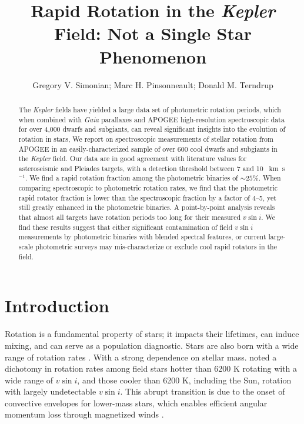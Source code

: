 \documentclass[manuscript]{aastex6}
\newcommand{\vsini}{\ensuremath{v \sin i}}
\newcommand{\Kepler}{\mbox{\textit{Kepler}}}
\newcommand{\Gaia}{\mbox{\textit{Gaia}}}
\newcommand{\kms}{\textrm{~km~s}\ensuremath{^{-1}}}
\newcommand{\gvs}{\authorcomment1}
\begin{document}
\title{Rapid Rotation in the \Kepler{} Field: Not a Single Star
Phenomenon}
\author{Gregory V. Simonian; Marc H. Pinsonneault; Donald M. Terndrup}

\begin{abstract}
    \gvs{This is still under construction.}
    The \Kepler{} fields have yielded a large data set of photometric rotation
    periods, which when combined with \Gaia{} parallaxes and APOGEE
    high-resolution spectroscopic data for over 4,000 dwarfs and subgiants, 
    can reveal significant insights into the evolution of rotation in stars, 
    We report on spectroscopic measurements of stellar rotation from APOGEE in an
    easily-characterized sample of over 600 cool dwarfs and subgiants in the
    \Kepler{} field. Our data are in good agreement with literature values for
    asteroseismic and Pleiades targets, with a detection threshold between 7 
    and 10 \kms. We find a rapid rotation fraction among the photometric
    binaries of \(\sim 25\%\). When comparing spectroscopic to photometric 
    rotation rates, we find that the photometric rapid rotator 
    fraction is lower than the spectroscopic fraction by a factor of 4--5, yet
    still greatly enhanced in the photometric binaries. A point-by-point 
    analysis reveals that almost all targets have rotation periods too long 
    for their measured \vsini{}. We find these results suggest that either 
    significant contamination of field \vsini{} measurements by photometric 
    binaries with blended spectral features, or current large-scale 
    photometric surveys may mis-characterize or exclude 
    cool rapid rotators in the field. 
\end{abstract}

\section{Introduction}

Rotation is a fundamental property of stars; it impacts their lifetimes, can
induce mixing, and can serve as a population diagnostic. Stars are also born 
with a wide range of rotation rates \citep{Attridge92, Herbst00, Henderson12}.
With a strong dependence on stellar mass. \citet{Kraft67} noted a dichotomy in
rotation rates among field stars hotter than 6200 K rotating with a wide range
of \vsini, and those cooler than 6200 K, including the Sun, rotation with
largely undetectable \vsini. This abrupt transition is due to the onset of
convective envelopes for lower-mass stars, which enables efficient angular
momentum loss through magnetized winds \citep{Parker58,Weber67}.
\end{document}
